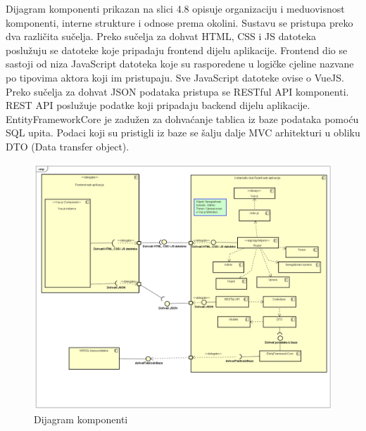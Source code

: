 	
		
		 \textnormal{Dijagram komponenti prikazan na slici 4.8 opisuje organizaciju i meduovisnost komponenti, interne strukture i odnose prema okolini. Sustavu se pristupa preko dva različita sučelja. Preko sučelja za dohvat HTML, CSS i JS datoteka poslužuju se datoteke koje pripadaju frontend dijelu aplikacije. Frontend dio se sastoji od niza JavaScript datoteka koje su rasporedene u logičke cjeline nazvane po tipovima aktora koji im pristupaju. Sve JavaScript datoteke ovise o VueJS. Preko sučelja za dohvat JSON podataka pristupa se RESTful API komponenti. REST API poslužuje podatke koji pripadaju backend dijelu aplikacije. EntityFrameworkCore je zadužen za dohvaćanje tablica iz baze podataka pomoću SQL upita. Podaci koji su pristigli iz baze se šalju dalje MVC arhitekturi u obliku DTO (Data transfer object).}
		 	\begin{figure}[H]
		 	\includegraphics[width=\linewidth]{dijagrami/Dijagram_komponenti.png}
		 	\centering
		 	\caption{Dijagram komponenti }
		 	\label{fig:ClassDiagram1}
		 \end{figure}